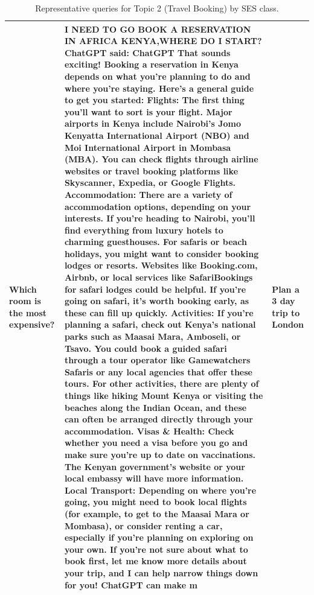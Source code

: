 \begin{table}[ht]
\begin{tabular}{p{4.3cm}p{4.3cm}p{4.3cm}}
Which room is the most expensive? & I NEED TO GO BOOK A RESERVATION IN AFRICA KENYA,WHERE DO I START? ChatGPT said: ChatGPT That sounds exciting! Booking a reservation in Kenya depends on what you're planning to do and where you're staying. Here’s a general guide to get you started:  Flights: The first thing you’ll want to sort is your flight. Major airports in Kenya include Nairobi’s Jomo Kenyatta International Airport (NBO) and Moi International Airport in Mombasa (MBA). You can check flights through airline websites or travel booking platforms like Skyscanner, Expedia, or Google Flights.  Accommodation: There are a variety of accommodation options, depending on your interests. If you're heading to Nairobi, you’ll find everything from luxury hotels to charming guesthouses. For safaris or beach holidays, you might want to consider booking lodges or resorts. Websites like Booking.com, Airbnb, or local services like SafariBookings for safari lodges could be helpful. If you’re going on safari, it’s worth booking early, as these can fill up quickly.  Activities: If you're planning a safari, check out Kenya's national parks such as Maasai Mara, Amboseli, or Tsavo. You could book a guided safari through a tour operator like Gamewatchers Safaris or any local agencies that offer these tours. For other activities, there are plenty of things like hiking Mount Kenya or visiting the beaches along the Indian Ocean, and these can often be arranged directly through your accommodation.  Visas \& Health: Check whether you need a visa before you go and make sure you're up to date on vaccinations. The Kenyan government’s website or your local embassy will have more information.  Local Transport: Depending on where you’re going, you might need to book local flights (for example, to get to the Maasai Mara or Mombasa), or consider renting a car, especially if you're planning on exploring on your own.  If you’re not sure about what to book first, let me know more details about your trip, and I can help narrow things down for you!       ChatGPT can make m & Plan a 3 day trip to London \\[4pt]
\bottomrule
\end{tabular}
\caption{Representative queries for Topic 2 (Travel Booking) by SES class.}
\label{tab:repr_queries_topic2}
\end{table}

